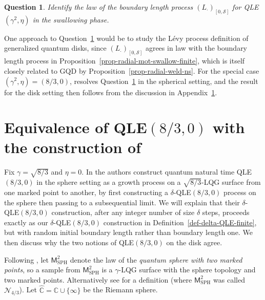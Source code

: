 \documentclass[a4paper]{article}
\numberwithin{equation}{section}
\newcommand{\qduration}{\mathcal{S}}
\newcommand{\GQD}{\mathrm{GQD}}
\newtheorem{question}[theorem]{Question}
\theoremstyle{remark}
\numberwithin{equation}{section}
\begin{document}
\begin{question}\label{question-length-process}
    Identify the law of the boundary length process $(L_\cdot)_{[0, \qduration]}$ for QLE$(\gamma^2, \eta)$ in the swallowing phase.
\end{question}
One approach to Question~\ref{question-length-process} would be to study the L\'evy process definition of generalized quantum disks, since $(L_\cdot)_{[0,\qduration]}$ agrees in law with the boundary length process in Proposition~\ref{prop-radial-mot-swallow-finite}, which is itself closely related to $\GQD$ by Proposition~\ref{prop-radial-weld-ns}. For the special case $(\gamma^2, \eta) = (8/3,0)$, \cite[Theorem 1.2]{ms-finite-mating} resolves Question~\ref{question-length-process} in the spherical setting, and the result for the disk setting then follows from the discussion in Appendix~\ref{sec-other-QLEs}.

\appendix

\section{Equivalence of QLE$(8/3,0)$ with the construction of \cite{ms-equivalence}}\label{sec-other-QLEs}


Fix $\gamma = \sqrt{8/3}$ and $\eta = 0$.  
In \cite{ms-equivalence} the authors construct quantum natural time QLE$(8/3, 0)$ in the sphere setting as a growth process on a $\sqrt{8/3}$-LQG surface from one marked point to another, by first constructing a $\delta$-QLE$(8/3,0)$ process on the sphere then passing to a subsequential limit. We will explain that their $\delta$-QLE$(8/3,0)$ construction, after any integer number of size $\delta$ steps, proceeds exactly as our $\delta$-QLE$(8/3,0)$ construction in Definition~\ref{def-delta-QLE-finite}, but with random initial boundary length rather than boundary length one. We then discuss why the two notions of QLE$(8/3,0)$ on the disk agree. 

Following \cite[Section 4.1]{ms-equivalence}, let $\mathsf{M}^2_\mathrm{SPH}$ denote the law of the \emph{quantum sphere with two marked points}, so a sample from $\mathsf{M}^2_\mathrm{SPH}$ is a $\gamma$-LQG surface with the sphere topology and two marked points. Alternatively see \cite[Section 4.5]{DMS14} for a definition (where $\mathsf{M}^2_\mathrm{SPH}$ was called $\mathcal N_{4/3}$). 
Let $\widehat {\mathbb C} = \mathbb C  \cup \{ \infty\}$ be the Riemann sphere. 
\end{document}
